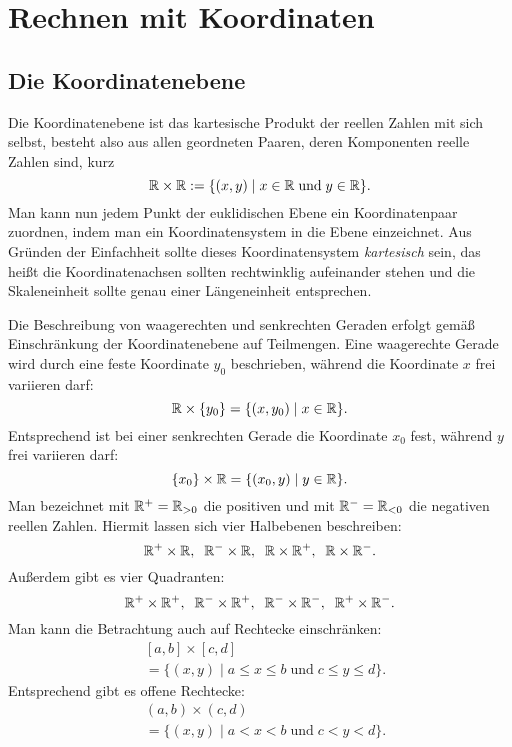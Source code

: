 \section{Rechnen mit Koordinaten}
\subsection{Die Koordinatenebene}

Die Koordinatenebene ist das kartesische Produkt der reellen
Zahlen mit sich selbst, besteht also aus allen geordneten Paaren,
deren Komponenten reelle Zahlen sind, kurz%
\begin{equation}
\mathbb R\times\mathbb R := \{(x,y)\mid x\in\mathbb R\;\text{und}\;y\in\mathbb R\}.
\end{equation}
Man kann nun jedem Punkt der euklidischen Ebene ein Koordinatenpaar
zuordnen, indem man ein Koordinatensystem in die Ebene einzeichnet.
Aus Gründen der Einfachheit sollte dieses Koordinatensystem
\emph{kartesisch} sein, das heißt die Koordinatenachsen sollten
rechtwinklig aufeinander stehen und die Skaleneinheit sollte genau
einer Längeneinheit entsprechen.

Die Beschreibung von waagerechten und senkrechten Geraden
erfolgt gemäß Einschränkung der Koordinatenebene auf Teilmengen.
Eine waagerechte Gerade wird durch eine feste Koordinate $y_0$
beschrieben, während die Koordinate $x$ frei variieren darf:%
\begin{equation}
\mathbb R\times\{y_0\} = \{(x,y_0)\mid x\in\mathbb R\}.
\end{equation}
Entsprechend ist bei einer senkrechten Gerade die Koordinate
$x_0$ fest, während $y$ frei variieren darf:%
\begin{equation}
\{x_0\}\times\mathbb R = \{(x_0,y)\mid y\in\mathbb R\}.
\end{equation}
Man bezeichnet mit $\mathbb R^+ = \mathbb R_{>0}$ die positiven und mit
$\mathbb R^- = \mathbb R_{<0}$ die negativen reellen Zahlen. Hiermit lassen
sich vier Halbebenen beschreiben:%
\begin{equation}
\mathbb R^+\times\mathbb R,\;\; \mathbb R^-\times\mathbb R,\;\; \mathbb R\times\mathbb R^+,\;\; \mathbb R\times\mathbb R^-.
\end{equation}
Außerdem gibt es vier Quadranten:
\begin{equation}
\mathbb R^+\times\mathbb R^+,\;\; \mathbb R^-\times\mathbb R^+,\;\; \mathbb R^-\times\mathbb R^-,\;\; \mathbb R^+\times\mathbb R^-.
\end{equation}
Man kann die Betrachtung auch auf Rechtecke einschränken:%
\begin{equation}
\begin{split}
&[a,b]\times [c,d]\\
&= \{(x,y)\mid a\le x\le b\;\mathrm{und}\;c\le y\le d\}.
\end{split}
\end{equation}
Entsprechend gibt es offene Rechtecke:
\begin{equation}
\begin{split}
&(a,b)\times (c,d)\\
&= \{(x,y)\mid a<x<b\;\mathrm{und}\;c<y<d\}.
\end{split}
\end{equation}


